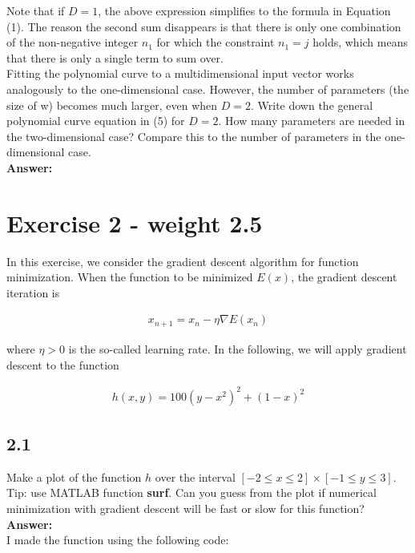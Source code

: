 \documentclass[a4paper]{article}
\begin{document}
Note that if $D = 1$, the above expression simplifies to the formula in Equation (1). The reason the second sum disappears is that there is only one combination of the non-negative integer $n_1$ for which the constraint $n_1 = j$ holds, which means that there is only a single term to sum over.\\

Fitting the polynomial curve to a multidimensional input vector works analogously to the one-dimensional case. However, the number of parameters (the size of w) becomes much larger, even when $D = 2$. Write down the general polynomial curve equation in (5) for $D = 2$. How many parameters are needed in the two-dimensional case? Compare this to the number of parameters in the one-dimensional case.\\


\textbf{Answer:}\\

\section*{Exercise 2 - weight 2.5}

In this exercise, we consider the gradient descent algorithm for function minimization. When the function to be minimized $E(x)$, the gradient descent iteration is

\begin{align*}
	x_{n+1} = x_n - \eta \nabla E(x_n)
\end{align*}

where $\eta > 0$ is the so-called learning rate. In the following, we will apply gradient descent to the function

\begin{align*}
	h(x,y) = 100(y - x^2)^2 + (1 - x)^2
\end{align*}

\subsection*{2.1}

Make a plot of the function $h$ over the interval $[-2 \leq x \leq 2] \times [-1 \leq y \leq 3]$. Tip: use MATLAB function \textbf{surf}. Can you guess from the plot if numerical minimization with gradient descent will be fast or slow for this function?\\

\textbf{Answer:}\\

I made the function using the following code:
\end{document}
